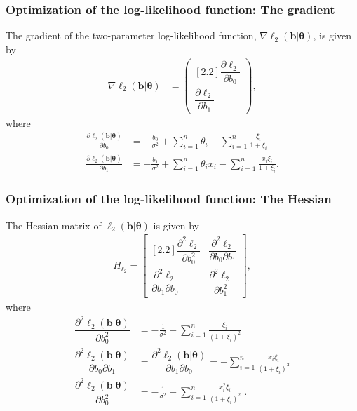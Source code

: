 \documentclass[11pt, letterpaper]{article}
\begin{document}
\subsubsection{Optimization of the log-likelihood function: The gradient}
The gradient of the two-parameter log-likelihood function, $\nabla \ell_2(\bm b | \bm \theta)$, is given by
\begin{align*}
\nabla \ell_2(\bm b | \bm \theta) &= \begin{pmatrix}[2.2]
\dfrac{\partial \ell_2}{\partial b_0}   \\
\dfrac{\partial \ell_2}{\partial b_1}  
\end{pmatrix},
\end{align*}
where 
\begin{align*}
\frac{\partial \ell_2 (\bm b | \bm \theta)}{\partial b_0}   &= -\frac{b_0}{\sigma^2} + \sum_{i=1}^n \theta_i - \sum_{i=1}^n \frac{\xi_i }{1+\xi_i} \\
\frac{\partial \ell_2 (\bm b | \bm \theta)}{\partial b_1}   &= -\frac{b_1}{\sigma^2} + \sum_{i=1}^n \theta_i x_i - \sum_{i=1}^n \frac{x_i \xi_i }{1+\xi_i}.
\end{align*}

\subsubsection{Optimization of the log-likelihood function: The Hessian}
The Hessian matrix of $\ell_2(\bm b | \bm \theta)$ is given by
\begin{align*}
H_{\ell_2} = \begin{bmatrix}[2.2]
\dfrac{\partial^2 \ell_2}{\partial b_0 ^2} & \dfrac{\partial^2 \ell_2}{\partial b_0 \partial b_1} \\
\dfrac{\partial^2 \ell_2}{\partial b_1  \partial b_0} & \dfrac{\partial^2 \ell_2}{\partial b_1^2} 
\end{bmatrix},
\end{align*}
where 
\begin{align*}
\dfrac{\partial^2 \ell_2(\bm b | \bm \theta)}{\partial b_0 ^2} &= -\frac{1}{\sigma^2} - \sum_{i=1}^n \frac{\xi_i }{\left(1+\xi_i\right)^2} \\
\dfrac{\partial^2 \ell_2(\bm b | \bm \theta)}{\partial b_0 \partial b_1} &= \dfrac{\partial^2 \ell_2(\bm b | \bm \theta)}{\partial b_1 \partial b_0} =  - \sum_{i=1}^n \frac{x_i \xi_i }{\left(1+\xi_i\right)^2} \\
\dfrac{\partial^2 \ell_2(\bm b | \bm \theta)}{\partial b_0 ^2} &= -\frac{1}{\sigma^2} - \sum_{i=1}^n \frac{x_i^2\xi_i }{\left(1+\xi_i\right)^2} \;. \\
\end{align*}
\end{document}
